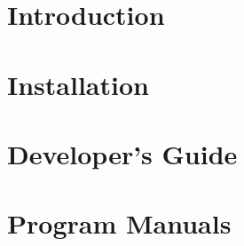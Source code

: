  \chapter{Introduction} 
    
    

  \chapter{Installation} \label{INSTALL} 
    

  \chapter{Developer's Guide} \label{DEVELOPERS-GUIDE} 
    
     
     
     
    
    
    
    
    
    
    
    
    
    


  \chapter{Program Manuals} \label{PROGRAM MANUALS} 
    
    


  \appendix
